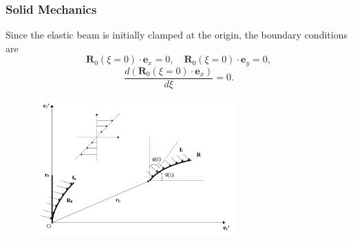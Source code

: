 \documentclass{beamer}
\begin{document}
\begin{frame}
	\frametitle{Solid Mechanics}
	\begin{overlayarea}{\textwidth}{\textheight}
Since the elastic beam is initially clamped at the origin, the boundary conditions are
\begin{equation*}
	\label{eqn:58}
	\mathbf{R}_0(\xi=0)\cdot\mathbf{e}_x=0,\quad \mathbf{R}_0(\xi=0)\cdot\mathbf{e}_y=0,
\end{equation*}
\begin{equation*}
	\label{eqn:60}
	\frac{d\left(\mathbf{R}_0(\xi=0)\cdot\mathbf{e}_x\right)}{d\xi}=0.
\end{equation*}
\vspace{-0.7cm}
\begin{figure}[htb]
	\begin{center}
		\includegraphics[width=0.7\textwidth]{plots/r0.png}
	\end{center}
\end{figure}
	\end{overlayarea}
\end{frame}

\end{document}
